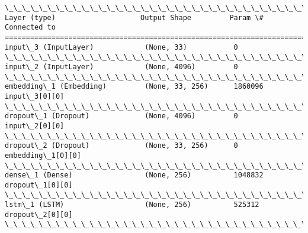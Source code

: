\documentclass[11pt]{article}
\begin{document}
    \begin{Verbatim}[commandchars=\\\{\}]
\_\_\_\_\_\_\_\_\_\_\_\_\_\_\_\_\_\_\_\_\_\_\_\_\_\_\_\_\_\_\_\_\_\_\_\_\_\_\_\_\_\_\_\_\_\_\_\_\_\_\_\_\_\_\_\_\_\_\_\_\_\_\_\_\_\_\_\_\_\_\_\_\_\_\_\_\_\_\_\_\_\_\_\_\_\_\_\_\_\_\_\_\_\_\_\_\_\_
Layer (type)                    Output Shape         Param \#     Connected to                     
==================================================================================================
input\_3 (InputLayer)            (None, 33)           0                                            
\_\_\_\_\_\_\_\_\_\_\_\_\_\_\_\_\_\_\_\_\_\_\_\_\_\_\_\_\_\_\_\_\_\_\_\_\_\_\_\_\_\_\_\_\_\_\_\_\_\_\_\_\_\_\_\_\_\_\_\_\_\_\_\_\_\_\_\_\_\_\_\_\_\_\_\_\_\_\_\_\_\_\_\_\_\_\_\_\_\_\_\_\_\_\_\_\_\_
input\_2 (InputLayer)            (None, 4096)         0                                            
\_\_\_\_\_\_\_\_\_\_\_\_\_\_\_\_\_\_\_\_\_\_\_\_\_\_\_\_\_\_\_\_\_\_\_\_\_\_\_\_\_\_\_\_\_\_\_\_\_\_\_\_\_\_\_\_\_\_\_\_\_\_\_\_\_\_\_\_\_\_\_\_\_\_\_\_\_\_\_\_\_\_\_\_\_\_\_\_\_\_\_\_\_\_\_\_\_\_
embedding\_1 (Embedding)         (None, 33, 256)      1860096     input\_3[0][0]                    
\_\_\_\_\_\_\_\_\_\_\_\_\_\_\_\_\_\_\_\_\_\_\_\_\_\_\_\_\_\_\_\_\_\_\_\_\_\_\_\_\_\_\_\_\_\_\_\_\_\_\_\_\_\_\_\_\_\_\_\_\_\_\_\_\_\_\_\_\_\_\_\_\_\_\_\_\_\_\_\_\_\_\_\_\_\_\_\_\_\_\_\_\_\_\_\_\_\_
dropout\_1 (Dropout)             (None, 4096)         0           input\_2[0][0]                    
\_\_\_\_\_\_\_\_\_\_\_\_\_\_\_\_\_\_\_\_\_\_\_\_\_\_\_\_\_\_\_\_\_\_\_\_\_\_\_\_\_\_\_\_\_\_\_\_\_\_\_\_\_\_\_\_\_\_\_\_\_\_\_\_\_\_\_\_\_\_\_\_\_\_\_\_\_\_\_\_\_\_\_\_\_\_\_\_\_\_\_\_\_\_\_\_\_\_
dropout\_2 (Dropout)             (None, 33, 256)      0           embedding\_1[0][0]                
\_\_\_\_\_\_\_\_\_\_\_\_\_\_\_\_\_\_\_\_\_\_\_\_\_\_\_\_\_\_\_\_\_\_\_\_\_\_\_\_\_\_\_\_\_\_\_\_\_\_\_\_\_\_\_\_\_\_\_\_\_\_\_\_\_\_\_\_\_\_\_\_\_\_\_\_\_\_\_\_\_\_\_\_\_\_\_\_\_\_\_\_\_\_\_\_\_\_
dense\_1 (Dense)                 (None, 256)          1048832     dropout\_1[0][0]                  
\_\_\_\_\_\_\_\_\_\_\_\_\_\_\_\_\_\_\_\_\_\_\_\_\_\_\_\_\_\_\_\_\_\_\_\_\_\_\_\_\_\_\_\_\_\_\_\_\_\_\_\_\_\_\_\_\_\_\_\_\_\_\_\_\_\_\_\_\_\_\_\_\_\_\_\_\_\_\_\_\_\_\_\_\_\_\_\_\_\_\_\_\_\_\_\_\_\_
lstm\_1 (LSTM)                   (None, 256)          525312      dropout\_2[0][0]                  
\_\_\_\_\_\_\_\_\_\_\_\_\_\_\_\_\_\_\_\_\_\_\_\_\_\_\_\_\_\_\_\_\_\_\_\_\_\_\_\_\_\_\_\_\_\_\_\_\_\_\_\_\_\_\_\_\_\_\_\_\_\_\_\_\_\_\_\_\_\_\_\_\_\_\_\_\_\_\_\_\_\_\_\_\_\_\_\_\_\_\_\_\_\_\_\_\_\_

\end{Verbatim}
\end{document}
